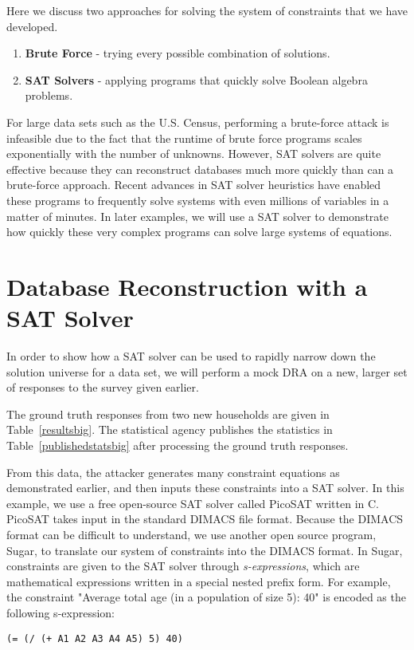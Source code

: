 \documentclass[runningheads]{llncs}
\begin{document}
Here we discuss two approaches for solving the system of constraints that we have developed.
\begin{enumerate}

\item \textbf{Brute Force} - trying every possible combination of solutions.\\

\item \textbf{SAT Solvers} - applying programs that quickly solve Boolean algebra problems.\\

\end{enumerate}

For large data sets such as the U.S. Census, performing a brute-force attack is infeasible due to the fact that the runtime of brute force programs scales exponentially with the number of unknowns.
However, SAT solvers are quite effective because they can reconstruct databases much more quickly than can a brute-force approach. Recent advances in SAT solver heuristics have enabled these programs to frequently solve systems with even millions of variables in a matter of minutes. In later examples, we will use a SAT solver to demonstrate how quickly these very complex programs can solve large systems of equations.

\section{Database Reconstruction with a SAT Solver}

In order to show how a SAT solver can be used to rapidly narrow down the solution universe for a data set, we will perform a mock DRA on a new, larger set of responses to the survey given earlier.

The ground truth responses from two new households are given in Table~\ref{resultsbig}. The statistical agency publishes the statistics in Table~\ref{publishedstatsbig} after processing the ground truth responses.


From this data, the attacker generates many constraint equations as demonstrated earlier,
and then inputs these constraints into a SAT solver. In this example, we use a free open-source SAT solver
called PicoSAT written in C. PicoSAT takes input in the standard DIMACS file format. Because the DIMACS format can be difficult to understand, we use another open source program, Sugar\cite{sugar}, to translate our system of constraints into the DIMACS format. In Sugar, constraints are given to the SAT solver through \textit{s-expressions}, which are mathematical expressions written in a special nested prefix form. For example, the constraint "Average total age (in a population of size 5): 40" is encoded as the following s-expression:
\begin{verbatim}
(= (/ (+ A1 A2 A3 A4 A5) 5) 40)
\end{verbatim}
\end{document}
